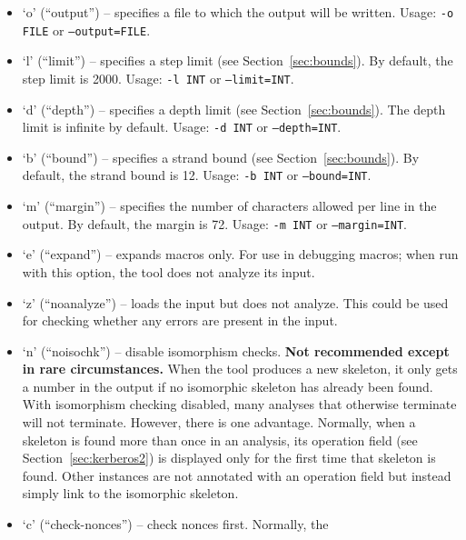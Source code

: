 \begin{itemize}
\item `o' (``output'') -- specifies a file to which the output will be written.
  Usage: \texttt{-o FILE} or \texttt{--output=FILE}.
   
\item `l' (``limit'') -- specifies a step limit (see
  Section~\ref{sec:bounds}).  By default, the step limit is 2000.
  Usage: \texttt{-l INT} or \texttt{--limit=INT}.
   
\item `d' (``depth'') -- specifies a depth limit (see
  Section~\ref{sec:bounds}).  The depth limit is infinite by default.
  Usage: \texttt{-d INT} or
  \texttt{--depth=INT}.  
\item `b' (``bound'') -- specifies a strand bound (see Section~\ref{sec:bounds}).
  By default, the strand bound is 12.
  Usage: \texttt{-b INT} or \texttt{--bound=INT}.
\item `m' (``margin'') -- specifies the number of characters allowed
  per line in the output. By default, the margin is 72.
  Usage: \texttt{-m INT} or \texttt{--margin=INT}.
\item `e' (``expand'') -- expands macros only.  For use in debugging
  macros; when run with this option, the tool does not analyze its
  input.
\item `z' (``noanalyze'') -- loads the input but does not analyze.
    This could be used for checking whether any errors are present in
    the input.
\item `n' (``noisochk'') -- disable isomorphism checks.  {\bf Not
  recommended except in rare circumstances.}  When the tool produces a
  new skeleton, it only gets a number in the output if no isomorphic
  skeleton has already been found.  With isomorphism checking
  disabled, many analyses that otherwise terminate will not terminate.
  However, there is one advantage.   Normally, when
  a skeleton is found more than once in an analysis, its operation
  field (see Section~\ref{sec:kerberos2}) is displayed only for the
  first time that skeleton is found.  Other instances are not
  annotated with an operation field but instead simply link to the
  isomorphic skeleton.
 
\item `c' (``check-nonces'') -- check nonces first.  Normally, the

\end{itemize}
